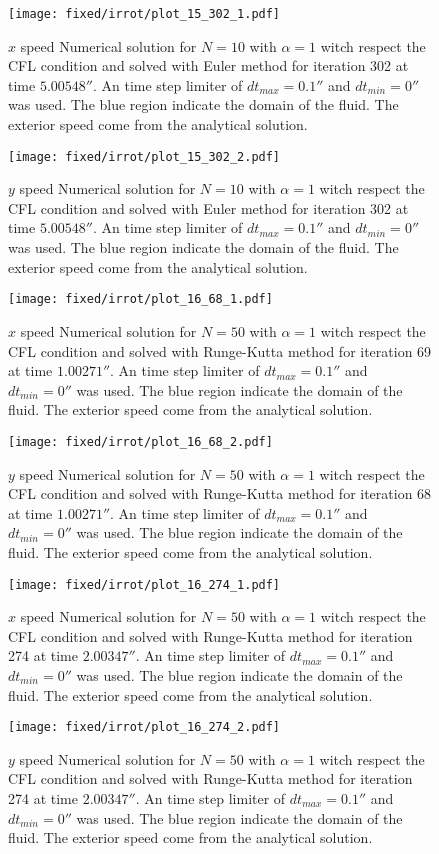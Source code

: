 \begin{figure}
\texttt{[image: fixed/irrot/plot\_15\_302\_1.pdf]}
\caption{$x$ speed Numerical solution for $N=10$ with $\alpha=1$ witch respect the CFL condition and solved with Euler method
for iteration 302 at time $\unit{5.00548}{\second}$.
An time step limiter of $dt_{max}=\unit{0.1}{\second}$ and $dt_{min}=\unit{0}{\second}$ was used.
The blue region indicate the domain of the fluid. The exterior speed come from the analytical solution.
}
\end{figure}
\begin{figure}
\texttt{[image: fixed/irrot/plot\_15\_302\_2.pdf]}
\caption{$y$ speed Numerical solution for $N=10$ with $\alpha=1$ witch respect the CFL condition and solved with Euler method
for iteration 302 at time $\unit{5.00548}{\second}$.
An time step limiter of $dt_{max}=\unit{0.1}{\second}$ and $dt_{min}=\unit{0}{\second}$ was used.
The blue region indicate the domain of the fluid. The exterior speed come from the analytical solution.
}
\end{figure}

\begin{figure}
\texttt{[image: fixed/irrot/plot\_16\_68\_1.pdf]}
\caption{$x$ speed Numerical solution for $N=50$ with $\alpha=1$ witch respect the CFL condition and solved with Runge-Kutta method
for iteration 69 at time $\unit{1.00271}{\second}$.
An time step limiter of $dt_{max}=\unit{0.1}{\second}$ and $dt_{min}=\unit{0}{\second}$ was used.
The blue region indicate the domain of the fluid. The exterior speed come from the analytical solution.
}
\end{figure}
\begin{figure}
\texttt{[image: fixed/irrot/plot\_16\_68\_2.pdf]}
\caption{$y$ speed Numerical solution for $N=50$ with $\alpha=1$ witch respect the CFL condition and solved with Runge-Kutta method
for iteration 68 at time $\unit{1.00271}{\second}$.
An time step limiter of $dt_{max}=\unit{0.1}{\second}$ and $dt_{min}=\unit{0}{\second}$ was used.
The blue region indicate the domain of the fluid. The exterior speed come from the analytical solution.
}
\end{figure}

\begin{figure}
\texttt{[image: fixed/irrot/plot\_16\_274\_1.pdf]}
\caption{$x$ speed Numerical solution for $N=50$ with $\alpha=1$ witch respect the CFL condition and solved with Runge-Kutta method
for iteration 274 at time $\unit{2.00347}{\second}$.
An time step limiter of $dt_{max}=\unit{0.1}{\second}$ and $dt_{min}=\unit{0}{\second}$ was used.
The blue region indicate the domain of the fluid. The exterior speed come from the analytical solution.
}
\end{figure}
\begin{figure}
\texttt{[image: fixed/irrot/plot\_16\_274\_2.pdf]}
\caption{$y$ speed Numerical solution for $N=50$ with $\alpha=1$ witch respect the CFL condition and solved with Runge-Kutta method
for iteration 274 at time $\unit{2.00347}{\second}$.
An time step limiter of $dt_{max}=\unit{0.1}{\second}$ and $dt_{min}=\unit{0}{\second}$ was used.
The blue region indicate the domain of the fluid. The exterior speed come from the analytical solution.
}
\end{figure}

